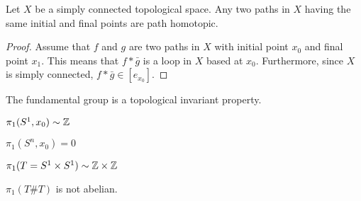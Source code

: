 \documentclass[letterpaper,12pt,fleqn]{article}
\begin{document}
\begin{theorem}
  Let \(X\) be a simply connected topological space.  Any two paths in \(X\) having the same initial and final
  points are path homotopic.
\end{theorem}

\begin{proof}
  Assume that \(f\) and \(g\) are two paths in \(X\) with initial point \(x_0\) and final point \(x_1\).  This means
  that \(f*\bar{g}\) is a loop in \(X\) based at \(x_0\).  Furthermore, since \(X\) is simply connected,
  \(f*\bar{g}\in[e_{x_0}]\).
\end{proof}

The fundamental group is a topological invariant property.

\(\pi_1(S^1,x_0)\sim\mathbb{Z}\)

\(\pi_1(S^n,x_0)=0\)

\(\pi_1(T=S^1\times S^1)\sim\mathbb{Z}\times\mathbb{Z}\)

\(\pi_1(T\#T)\) is not abelian.
\end{document}
